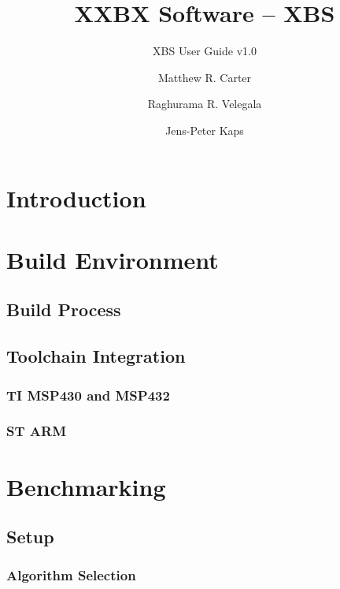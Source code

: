 \documentclass[twoside,11pt]{cergdoc}
\begin{document}
\title{XXBX Software -- XBS}
\subtitle{XBS User Guide v1.0}
\author{Matthew R. Carter \and Raghurama R. Velegala \and Jens-Peter Kaps}

\maketitle

\tableofcontents

\chapter{Introduction}
\chapter{Build Environment}
  \section{Build Process}
  \section{Toolchain Integration}
    \subsection{TI MSP430 and MSP432}
    \subsection{ST ARM}
\chapter{Benchmarking}
  \section{Setup}
    \subsection{Algorithm Selection}
\end{document}
